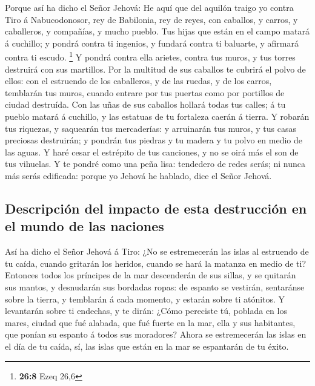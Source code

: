  Porque así ha dicho el Señor Jehová: He aquí que del
aquilón traigo yo contra Tiro á Nabucodonosor, rey de Babilonia, rey de
reyes, con caballos, y carros, y caballeros, y compañías, y mucho
pueblo.  Tus hijas que están en el campo matará á
cuchillo; y pondrá contra ti ingenios, y fundará contra ti baluarte, y
afirmará contra ti escudo. \footnote{\textbf{26:8} Ezeq 26,6}
 Y pondrá contra ella arietes, contra tus muros, y tus
torres destruirá con sus martillos.  Por la multitud de
sus caballos te cubrirá el polvo de ellos: con el estruendo de los
caballeros, y de las ruedas, y de los carros, temblarán tus muros,
cuando entrare por tus puertas como por portillos de ciudad destruída.
 Con las uñas de sus caballos hollará todas tus calles; á
tu pueblo matará á cuchillo, y las estatuas de tu fortaleza caerán á
tierra.  Y robarán tus riquezas, y saquearán tus
mercaderías: y arruinarán tus muros, y tus casas preciosas destruirán; y
pondrán tus piedras y tu madera y tu polvo en medio de las aguas.
 Y haré cesar el estrépito de tus canciones, y no se oirá
más el son de tus vihuelas.  Y te pondré como una peña
lisa: tendedero de redes serás; ni nunca más serás edificada: porque yo
Jehová he hablado, dice el Señor Jehová.

\hypertarget{descripciuxf3n-del-impacto-de-esta-destrucciuxf3n-en-el-mundo-de-las-naciones}{%
\subsection{Descripción del impacto de esta destrucción en el mundo de
las
naciones}\label{descripciuxf3n-del-impacto-de-esta-destrucciuxf3n-en-el-mundo-de-las-naciones}}

 Así ha dicho el Señor Jehová á Tiro: ¿No se estremecerán
las islas al estruendo de tu caída, cuando gritarán los heridos, cuando
se hará la matanza en medio de ti?  Entonces todos los
príncipes de la mar descenderán de sus sillas, y se quitarán sus mantos,
y desnudarán sus bordadas ropas: de espanto se vestirán, sentaránse
sobre la tierra, y temblarán á cada momento, y estarán sobre ti
atónitos.  Y levantarán sobre ti endechas, y te dirán:
¿Cómo pereciste tú, poblada en los mares, ciudad que fué alabada, que
fué fuerte en la mar, ella y sus habitantes, que ponían su espanto á
todos sus moradores?  Ahora se estremecerán las islas en
el día de tu caída, sí, las islas que están en la mar se espantarán de
tu éxito.

